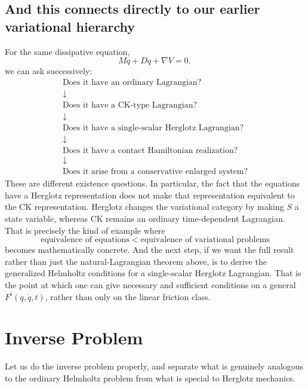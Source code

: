 \subsection{ And this connects directly to our earlier variational hierarchy}

For the same dissipative equation,
$$ M\ddot q+D\dot q+\nabla V=0, $$
we can ask successively:
$$ \boxed{ \begin{array}{c} \text{Does it have an ordinary Lagrangian?}\\ \downarrow\\ \text{Does it have a CK-type Lagrangian?}\\ \downarrow\\ \text{Does it have a single-scalar Herglotz Lagrangian?}\\ \downarrow\\ \text{Does it have a contact Hamiltonian realization?}\\ \downarrow\\ \text{Does it arise from a conservative enlarged system?} \end{array}} $$
These are different existence questions.
In particular, the fact that the equations have a Herglotz representation does not make that representation equivalent to the CK representation. Herglotz changes the variational category by making \(S\) a state variable, whereas CK remains an ordinary time-dependent Lagrangian.
That is precisely the kind of example where
$$ \boxed{ \text{equivalence of equations} \;<\; \text{equivalence of variational problems} } $$
becomes mathematically concrete.
And the next step, if we want the full result rather than just the natural-Lagrangian theorem above, is to derive the generalized Helmholtz conditions for a single-scalar Herglotz Lagrangian. That is the point at which one can give necessary and sufficient conditions on a general \(F^i(q,\dot q,t)\), rather than only on the linear friction class.

\section{Inverse Problem}

Let us do the inverse problem properly, and separate what is genuinely analogous to the ordinary Helmholtz problem from what is special to Herglotz mechanics.

